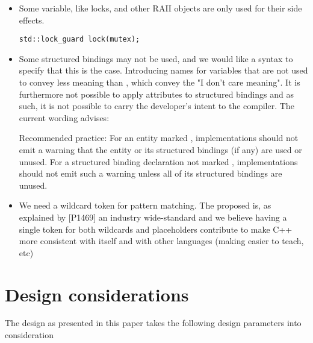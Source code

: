 \documentclass{wg21}
\begin{document}
\begin{itemize}
\item Some variable, like locks,  and other RAII objects are only used for their side effects.

\begin{lstlisting}[style=color]
std::lock_guard lock(mutex);
\end{lstlisting}

\item Some structured bindings may not be used, and we would like a syntax to specify that this is the case. Introducing names for variables that
are not used to convey less meaning than \tcode{_}, which convey the "I don't care meaning".
It is furthermore not possible to apply attributes to structured bindings and as such, it is not possible to carry the developer's intent to
the compiler.
The current wording advises:

\begin{quoteblock}
Recommended practice: For an entity marked , implementations should not emit a warning that the entity or its structured bindings (if any) are used or unused. For a structured binding declaration not marked , implementations should not emit such a warning unless all of its structured bindings are unused.
\end{quoteblock}

\item We need a wildcard token for pattern matching. The proposed \tcode{_} is, as explained by [P1469]\cite{P1469R0}
an industry wide-standard and we believe having a single token \tcode{_} for both wildcards and placeholders contribute
to make C++ more consistent with itself and with other languages (making easier to teach, etc)

\end{itemize}

\section{Design considerations}

The design as presented in this paper takes the following design parameters into consideration
\end{document}
